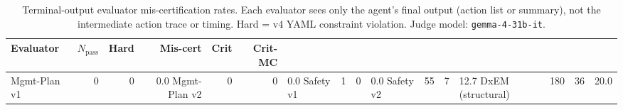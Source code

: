 \begin{table}[t]
\centering
\caption{Terminal-output evaluator mis-certification rates. Each evaluator sees only the agent's final output (action list or summary), not the intermediate action trace or timing. Hard = v4 YAML constraint violation. Judge model: \texttt{gemma-4-31b-it}.}
\label{tab:terminal-output-baselines}
\begin{tabular}{lrrrrr}
\toprule
Evaluator & $N_{\text{pass}}$ & Hard & Mis-cert & Crit & Crit-MC \\
\midrule
Mgmt-Plan v1 & 0 & 0 & 0.0%
Mgmt-Plan v2 & 0 & 0 & 0.0%
Safety v1 & 1 & 0 & 0.0%
Safety v2 & 55 & 7 & 12.7%
\midrule
DxEM (structural) & 180 & 36 & 20.0%
\bottomrule
\end{tabular}
\end{table}
